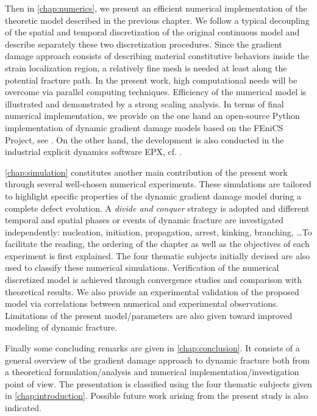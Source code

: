 Then in \cref{chap:numerics}, we present an efficient numerical implementation of the theoretic model described in the previous chapter. We follow a typical decoupling of the spatial and temporal discretization of the original continuous model and describe separately these two discretization procedures. Since the gradient damage approach consists of describing material constitutive behaviors inside the strain localization region, a relatively fine mesh is needed at least along the potential fracture path. In the present work, high computational needs will be overcome via parallel computing techniques. Efficiency of the numerical model is illustrated and demonstrated by a strong scaling analysis. In terms of final numerical implementation, we provide on the one hand an open-source Python implementation of dynamic gradient damage models based on the FEniCS Project, see \cite{LiMaurini:2015}. On the other hand, the development is also conducted in the industrial explicit dynamics software EPX, cf. \cite{EPX:2015}.

\cref{chap:simulation} constitutes another main contribution of the present work through several well-chosen numerical experiments. These simulations are tailored to highlight specific properties of the dynamic gradient damage model during a complete defect evolution. A \emph{divide and conquer} strategy is adopted and different temporal and spatial phases or events of dynamic fracture are investigated independently: nucleation, initiation, propagation, arrest, kinking, branching, \ldots To facilitate the reading, the ordering of the chapter as well as the objectives of each experiment is first explained. The four thematic subjects initially devised are also used to classify these numerical simulations. Verification of the numerical discretized model is achieved through convergence studies and comparison with theoretical results. We also provide an experimental validation of the proposed model via correlations between numerical and experimental observations. Limitations of the present model/parameters are also given toward improved modeling of dynamic fracture.

Finally some concluding remarks are given in \cref{chap:conclusion}. It consists of a general overview of the gradient damage approach to dynamic fracture both from a theoretical formulation/analysis and numerical implementation/investigation point of view. The presentation is classified using the four thematic subjects given in \cref{chap:introduction}. Possible future work arising from the present study is also indicated. 

